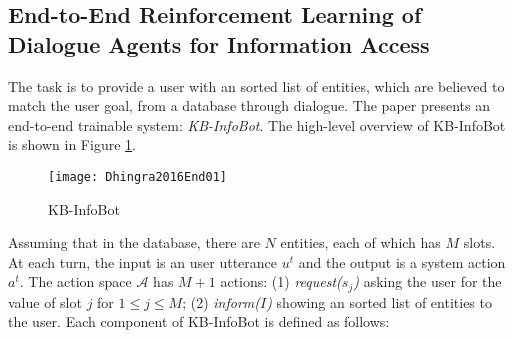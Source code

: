 \subsection{End-to-End Reinforcement Learning of Dialogue Agents for Information Access \cite{Dhingra2016End}}
The task is to provide a user with an sorted list of entities, which are believed to match the user goal, from a database through dialogue. The paper presents an end-to-end trainable system: \emph{KB-InfoBot}. The high-level overview of KB-InfoBot is shown in Figure \ref{fig:Dhingra2016End01}.

\begin{figure}[htbp]
  \centering
  \texttt{[image: Dhingra2016End01]}
  \caption{KB-InfoBot}
	\label{fig:Dhingra2016End01}
\end{figure}

Assuming that in the database, there are $N$ entities, each of which has $M$ slots. At each turn, the input is an user utterance $u^{t}$ and the output is a system action $a^{t}$. The action space $\mathcal{A}$ has $M+1$ actions: (1) \emph{request($s_{j}$)} asking the user for the value of slot $j$ for $1 \leq j \leq M$; (2) \emph{inform($I$)} showing an sorted list of entities to the user. Each component of KB-InfoBot is defined as follows:

